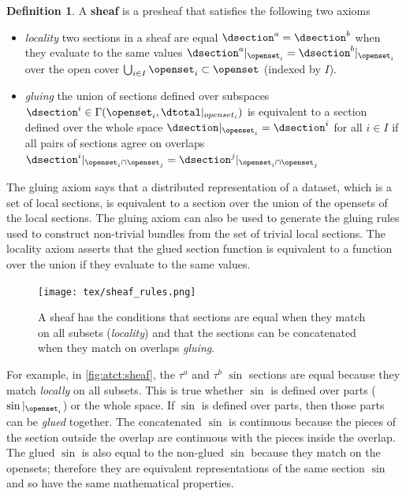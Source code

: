 \documentclass[journal]{IEEEtran}
\theoremstyle{definition}
\newtheorem{definition}{Definition}[section]
\theoremstyle{remark}
\begin{document}
\begin{definition}\label{def:atct:sheaf}\cite{bakerEuclideanSpaceMathsSheaf,spanier1989algebraic} A \textbf{sheaf} is a presheaf that satisfies the following two axioms
\begin{itemize}
  \item \textit{locality} two sections in a sheaf are equal $\dsection^{a} = \dsection^{b}$ when they evaluate to the same values $\dsection^{a}\vert_{\openset_i} =  \dsection^{b}\vert_{\openset_i}$ over the open cover $\bigcup_{i\in I} \openset_{i} \subset \openset$ (indexed by $I$).
  \item \textit{gluing} the union of sections defined over subspaces $\dsection^{i} \in \Gamma(\openset_i, \dtotal|_{openset_i})$ is equivalent to a section defined over the whole space $\dsection\vert_{\openset_i} = \dsection^{i}$ for all $i\in I$ if all pairs of sections agree on overlaps $\dsection^{i}\vert_{\openset_i\cap\openset_j} =  \dsection^{j}\vert_{\openset_i\cap\openset_j}$
  \end{itemize}
\end{definition}

The gluing axiom says that a distributed representation of a dataset, which is a set of local sections, is equivalent to a section over the union of the opensets of the local sections. The gluing axiom can also be used to generate the gluing rules used to construct non-trivial bundles from the set of trivial local sections. The locality axiom asserts that the glued section function is equivalent to a function over the union if they evaluate to the same values.

\begin{figure}[h]
  \texttt{[image: tex/sheaf\_rules.png]}
  \caption{A sheaf has the conditions that sections are equal when they match on all subsets (\textit{locality}) and that the sections can be concatenated when they match on overlaps \textit{gluing}.\label{fig:atct:sheaf}}
\end{figure}

For example, in \autoref{fig:atct:sheaf}, the $\tau^{a}$ and $\tau^{b}$ $\sin$ sections are equal because they match \textit{locally} on all subsets. This is true whether $\sin$ is defined over parts ($\sin\vert_{\openset_i}$) or the whole space. If $\sin$ is defined over parts, then those parts can be \textit{glued} together. The concatenated $\sin$ is continuous because the pieces of the section outside the overlap are continuous with the pieces inside the overlap. The glued $\sin$ is also equal to the non-glued $\sin$ because they match on the opensets; therefore they are equivalent representations of the same section $\sin$ and so have the same mathematical properties.
\end{document}
